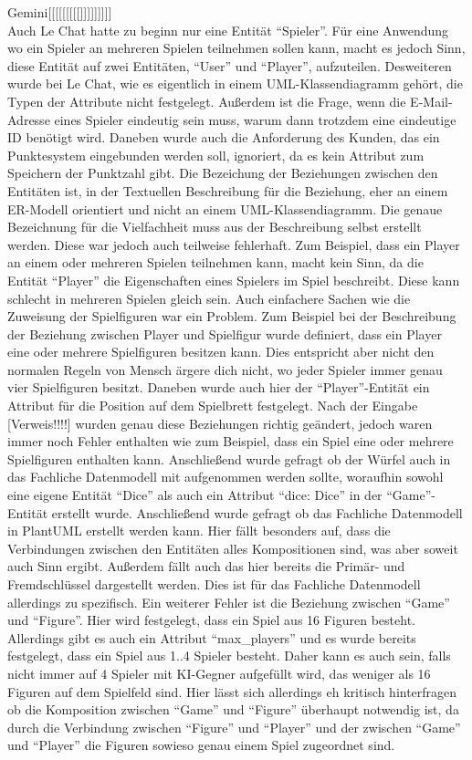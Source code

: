 Gemini[[[[[[[[[]]]]]]]]]\\

Auch Le Chat hatte zu beginn nur eine Entität ``Spieler''. Für eine Anwendung wo ein Spieler an mehreren Spielen teilnehmen sollen kann, macht es jedoch Sinn, diese 
Entität auf zwei Entitäten, ``User'' und ``Player'', aufzuteilen. Desweiteren wurde bei Le Chat, wie es eigentlich in einem UML-Klassendiagramm gehört, die Typen der
Attribute nicht festgelegt. Außerdem ist die Frage, wenn die E-Mail-Adresse eines Spieler eindeutig sein muss, warum dann trotzdem eine eindeutige ID benötigt wird.
Daneben wurde auch die Anforderung des Kunden, das ein Punktesystem eingebunden werden soll, ignoriert, da es kein Attribut zum Speichern der Punktzahl gibt.
Die Bezeichung der Beziehungen zwischen den Entitäten ist, in der Textuellen Beschreibung für die Beziehung, eher an einem ER-Modell orientiert und nicht an einem 
UML-Klassendiagramm. Die genaue Bezeichnung für die Vielfachheit muss aus der Beschreibung selbst erstellt werden. Diese war jedoch auch teilweise fehlerhaft. Zum 
Beispiel, dass ein Player an einem oder mehreren Spielen teilnehmen kann, macht kein Sinn, da die Entität ``Player'' die Eigenschaften eines Spielers
im Spiel beschreibt. Diese kann schlecht in mehreren Spielen gleich sein. Auch einfachere Sachen wie die Zuweisung der Spielfiguren war ein Problem. Zum Beispiel bei 
der Beschreibung der Beziehung zwischen Player und Spielfigur wurde definiert, dass ein Player eine oder mehrere Spielfiguren besitzen kann. Dies entspricht aber nicht 
den normalen Regeln von Mensch ärgere dich nicht, wo jeder Spieler immer genau vier Spielfiguren besitzt. Daneben wurde auch hier der ``Player''-Entität ein Attribut
für die Position auf dem Spielbrett festgelegt. Nach der Eingabe [Verweis!!!!] wurden genau diese Beziehungen richtig geändert, jedoch waren immer noch Fehler enthalten
wie zum Beispiel, dass ein Spiel eine oder mehrere Spielfiguren enthalten kann. Anschließend wurde gefragt ob der Würfel auch in das Fachliche Datenmodell mit aufgenommen
werden sollte, woraufhin sowohl eine eigene Entität ``Dice'' als auch ein Attribut ``dice: Dice'' in der ``Game''-Entität erstellt wurde. Anschließend wurde gefragt ob 
das Fachliche Datenmodell in PlantUML erstellt werden kann. Hier fällt besonders auf, dass die Verbindungen zwischen den Entitäten alles Kompositionen sind, was aber soweit
auch Sinn ergibt. Außerdem fällt auch das hier bereits die Primär- und Fremdschlüssel dargestellt werden. Dies ist für das Fachliche Datenmodell allerdings zu spezifisch.
Ein weiterer Fehler ist die Beziehung zwischen ``Game'' und ``Figure''. Hier wird festgelegt, dass ein Spiel aus 16 Figuren besteht. Allerdings gibt es auch ein 
Attribut ``max\_players'' und es wurde bereits festgelegt, dass ein Spiel aus 1..4 Spieler besteht. Daher kann es auch sein, falls nicht immer auf 4 Spieler mit KI-Gegner aufgefüllt 
wird, das weniger als 16 Figuren auf dem Spielfeld sind. Hier lässt sich allerdings eh kritisch hinterfragen ob die Komposition zwischen ``Game'' und ``Figure'' überhaupt 
notwendig ist, da durch die Verbindung zwischen ``Figure'' und ``Player'' und der zwischen ``Game'' und ``Player'' die Figuren sowieso genau einem Spiel zugeordnet sind.\\

